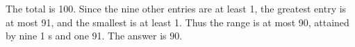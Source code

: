 The total is 100. Since the nine other entries are at least 1, the greatest entry is at most 91, and the smallest is at least 1. Thus the range is at most 90, attained by nine 1 s and one 91. The answer is $\boxed{90}$.
